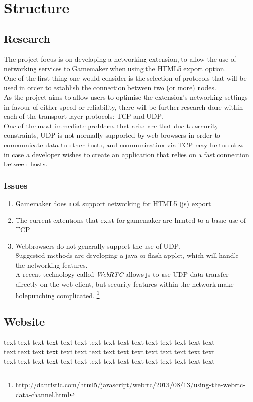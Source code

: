 \documentclass[12pt]{report}
\begin{document}
\section*{Structure}

\subsection*{Research}
The project focus is on developing a networking extension, to allow the use of networking services to Gamemaker when using the HTML5 export option.\\
One of the first thing one would consider is the selection of protocols that will be used in order to establish the connection between two (or more) nodes.\\
As the project aims to allow users to optimise the extension's networking settings in favour of either speed or reliability, there will be further research done within each of the transport layer protocols: TCP and UDP.\\
One of the most immediate problems that arise are that due to security constraints, UDP is not normally supported by web-browsers in order to communicate data to other hosts, and communication via TCP may be too slow in case a developer wishes to create an application that relies on a fast connection between hosts.

\subsubsection{Issues}
\begin{enumerate}
\item Gamemaker does \textbf{not} support networking for HTML5 (js) export
\item The current extentions that exist for gamemaker are limited to a basic use of TCP
\item Webbrowsers do not generally support the use of UDP.
\\Suggested methods are developing a java or flash applet, which will handle the networking features.
\\A recent technology called \emph{WebRTC} allows js to use UDP data transfer directly on the web-client, but security features  within the network make holepunching complicated. \footnote{http://danristic.com/html5/javascript/webrtc/2013/08/13/using-the-webrtc-data-channel.html} 
\end{enumerate} 

\subsection*{Website}
text text text text text text text text text text text text text text text\\text text text text text text text text text text text text text text text\\text text text text text text text text text text text text text text text\\
\end{document}
